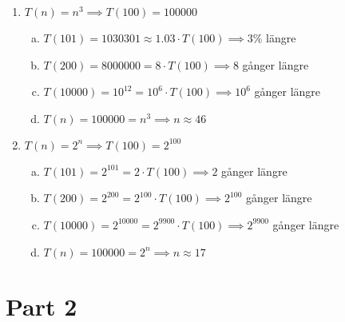 \documentclass[a4paper]{report}
\begin{document}
\begin{enumerate}
\begin{enumerate}[(a)]
          \end{enumerate}
    \item $T(n) = n^{3} \implies T(100) = 100000$
          \begin{enumerate}[(a)]
              \item $T(101) = 1030301 \approx  1.03 \cdot T(100) \implies 3 \%$ längre
              \item $T(200) = 8000000 = 8 \cdot T(100) \implies 8$ gånger längre
              \item $T(10000) = 10^{12} = 10^{6} \cdot T(100) \implies 10^{6}$ gånger längre
              \item $T(n) = 100000 = n^{3} \implies n \approx  46 $
          \end{enumerate}
    \item $T(n) = 2^{n} \implies T(100) = 2^{100}$
          \begin{enumerate}[(a)]
              \item $T(101) = 2^{101} =  2 \cdot T(100) \implies 2 $ gånger längre
              \item $T(200) = 2^{200} =  2^{100} \cdot T(100) \implies 2^{100} $ gånger längre
              \item $T(10000) = 2^{10000} =  2^{9900} \cdot T(100) \implies 2^{9900} $ gånger längre
              \item $T(n) = 100000 = 2^{n} \implies n \approx  17 $
          \end{enumerate}
\end{enumerate}

\newpage

\section*{Part 2}
\end{document}
